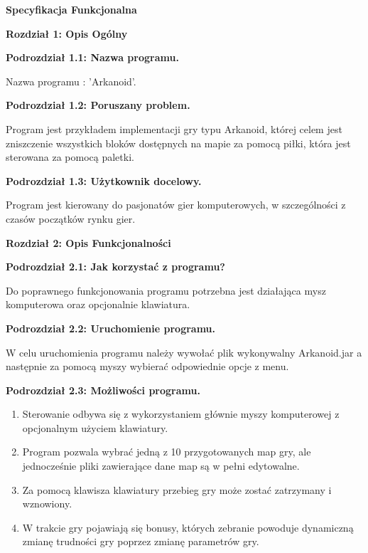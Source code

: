 \documentclass[a4paper]{article}
\begin{document}
\clearpage\setcounter{page}{1}\setlength{\parindent}{0in}
{\centering
\textbf{Specyfikacja Funkcjonalna}
\par}


\bigskip

\textbf{Rozdzia{\l} 1: Opis Ogólny}

\bigskip
\textbf{Podrozdzia{\l} 1.1: Nazwa programu.}

Nazwa programu : 'Arkanoid'.

\bigskip
\textbf{Podrozdzia{\l} 1.2: Poruszany problem.}

Program jest przykładem implementacji gry typu Arkanoid, której celem jest zniszczenie wszystkich bloków dostępnych na mapie za pomocą piłki, która jest sterowana za pomocą paletki.

\bigskip
\textbf{Podrozdzia{\l} 1.3: U\.zytkownik docelowy.}

Program jest kierowany do pasjonatów gier komputerowych, w szczególności z czasów początków rynku gier.

\bigskip
\textbf{Rozdzia{\l} 2: Opis Funkcjonalno\'sci}
\bigskip

\textbf{Podrozdzia{\l} 2.1: Jak korzysta\'c z programu?}

Do poprawnego funkcjonowania programu potrzebna jest działająca mysz komputerowa oraz opcjonalnie klawiatura.

\bigskip
\textbf{Podrozdzia{\l} 2.2: Uruchomienie programu.}

W celu uruchomienia programu nale\.zy wywołać plik wykonywalny Arkanoid.jar a następnie za pomocą myszy wybierać odpowiednie opcje z menu.

\bigskip
\textbf{Podrozdzia{\l} 2.3: Mo\.zliwo\'sci programu.}

\begin{enumerate}
    \item Sterowanie odbywa się z wykorzystaniem głównie myszy komputerowej z opcjonalnym użyciem klawiatury.

    \item Program pozwala wybrać jedną z 10 przygotowanych map gry, ale jednocześnie pliki zawierające dane map są w pełni edytowalne.

    \item Za pomocą klawisza klawiatury przebieg gry może zostać zatrzymany i wznowiony.

    \item W trakcie gry pojawiają się bonusy, których zebranie powoduje dynamiczną zmianę trudności gry poprzez zmianę parametrów gry.
\end{enumerate}
\end{document}
